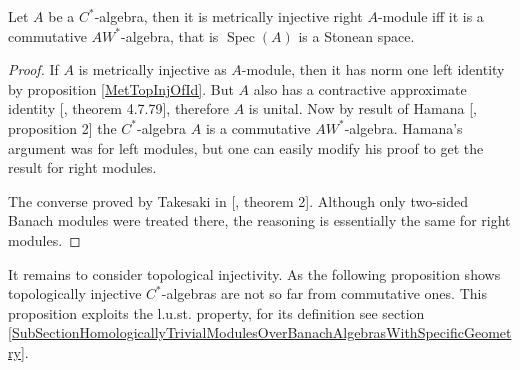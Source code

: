 \begin{proposition}\label{MetInjCStarAlgCharac} Let $A$ be a $C^*$-algebra, then it is metrically injective right $A$-module iff it is a commutative $AW^*$-algebra, that is $\operatorname{Spec}(A)$ is a Stonean space.
\end{proposition}
\begin{proof} 

If $A$ is metrically injective as $A$-module, then it has norm one left identity by proposition \ref{MetTopInjOfId}. But $A$ also has a contractive approximate identity  [\cite{HelBanLocConvAlg}, theorem 4.7.79], therefore $A$ is unital. Now by result of Hamana  [\cite{HamInjEnvBanMod}, proposition 2] the $C^*$-algebra $A$ is a commutative $AW^*$-algebra. Hamana's argument was for left modules, but one can easily modify his proof to get the result for right modules.

The converse proved by Takesaki in [\cite{TakHanBanThAndJordDecomOfModMap}, theorem 2]. Although only two-sided Banach modules were treated there, the reasoning is essentially the same for right modules.
\end{proof}

It remains to consider topological injectivity. As the following proposition shows topologically injective $C^*$-algebras are not so far from commutative ones. This proposition exploits the l.u.st. property, for its definition see section  \ref{SubSectionHomologicallyTrivialModulesOverBanachAlgebrasWithSpecificGeometry}.

